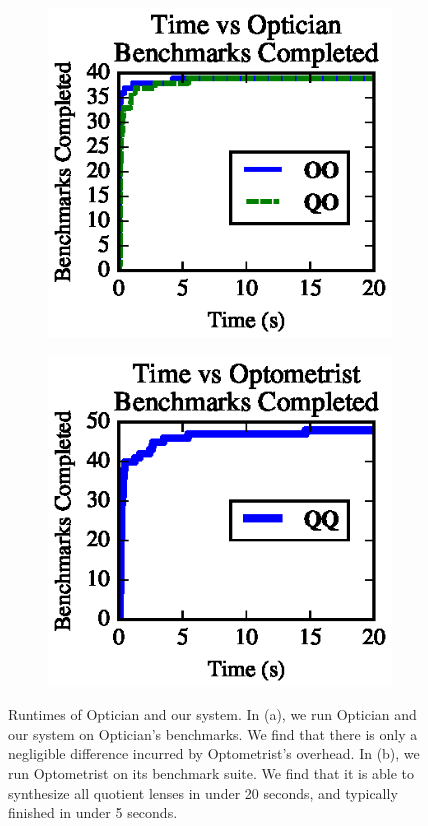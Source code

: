 \documentclass[acmsmall,review,anonymous]{acmart}
\begin{document}
\begin{figure}[t]
\centering
\begin{subfigure}[b]{.49\textwidth}
\centering
\includegraphics{generated-graphs/times_opt}
\caption{}
\label{subfig:lenssize}
\end{subfigure}
\begin{subfigure}[b]{.49\textwidth}
\includegraphics{generated-graphs/times_new.eps}
\caption{}
\label{subfig:examplesused}
\end{subfigure}
\caption{Runtimes of Optician and our system.
In (a), we run Optician and our system on Optician's benchmarks.  We find that
there is only a negligible difference incurred by Optometrist's overhead.
In (b), we run Optometrist on its benchmark suite.  We find that it is able
to synthesize all quotient lenses in under 20 seconds, and typically
finished in under 5 seconds. }
\label{fig:times}
\end{figure}
\end{document}
